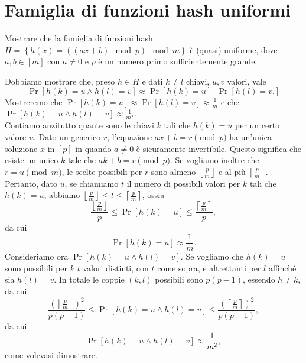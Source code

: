 \chapter{Famiglia di funzioni hash uniformi}

\begin{problem*}
    Mostrare che la famiglia di funzioni hash 
    \(H = \left\{h(x) = ((ax + b ) \mod p) \mod m\right\}\) \`e (quasi) uniforme, dove 
    \(a,b\in [m]\) con \(a\neq 0\) e \(p\) \`e un numero primo sufficientemente grande.
\end{problem*}
Dobbiamo mostrare che, preso $h\in H$ e dati $k\neq l$ chiavi, $u, v$ valori, vale \[\Pr[h(k)=u \wedge h(l)=v]\approx\Pr[h(k)=u]\cdot\Pr[h(l)=v.]\] Mostreremo che $\Pr[h(k)=u]\approx\Pr[h(l)=v]\approx\frac{1}{m}$ e che $\Pr[h(k)=u \wedge h(l)=v]\approx\frac{1}{m^2}$.
\[\]
Contiamo anzitutto quante sono le chiavi $k$ tali che $h(k)=u$ per un certo valore $u$.\newline
Dato un generico $r$, l'equazione $ax+b=r \pmod p$ ha un'unica soluzione $x$ in $[p]$ in quando $a\neq0$ è sicuramente invertibile. Questo significa che esiste un unico $k$ tale che $ak+b=r \pmod p$.\newline
Se vogliamo inoltre che $r = u \pmod m$, le scelte possibili per $r$ sono almeno $\left\lfloor\frac{p}{m}\right\rfloor$ e al più $\left\lceil \frac{p}{m}\right\rceil$.\newline
Pertanto, dato $u$, se chiamiamo $t$ il numero di possibili valori per $k$ tali che $h(k)=u$, abbiamo $\left\lfloor\frac{p}{m}\right\rfloor\le t \le \left\lceil \frac{p}{m}\right\rceil$, ossia \[\frac{\left\lfloor\frac{p}{m}\right\rfloor}{p}\le\Pr[h(k)=u]\le\frac{\left\lceil \frac{p}{m}\right\rceil}{p},\] da cui \[\Pr[h(k)=u]\approx\frac{1}{m}.\]
\[\]
Consideriamo ora $\Pr[h(k)=u \wedge h(l)=v]$. Se vogliamo che $h(k)=u$ sono possibili per $k$ $t$ valori distinti, con $t$ come sopra, e altrettanti per $l$ affinché sia $h(l)=v$. In totale le coppie $(k, l)$ possibili sono $p(p-1)$, essendo $h\neq k$, da cui \[\frac{\left(\left\lfloor\frac{p}{m}\right\rfloor\right)^2}{p(p-1)}\le \Pr[h(k)=u \wedge h(l)=v]\le\frac{\left(\left\lceil \frac{p}{m}\right\rceil\right)^2}{p(p-1)},\] da cui \[\Pr[h(k)=u \wedge h(l)=v]\approx\frac{1}{m^2},\] come volevasi dimostrare.

